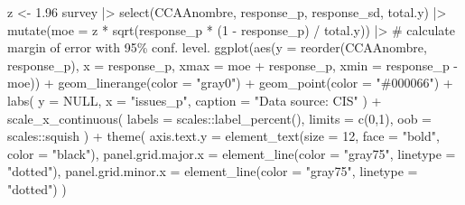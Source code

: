 \documentclass[
]{report}
\newenvironment{Shaded}{\begin{snugshade}}{\end{snugshade}}
\newcommand{\AttributeTok}[1]{\textcolor[rgb]{0.40,0.45,0.13}{#1}}
\newcommand{\CommentTok}[1]{\textcolor[rgb]{0.37,0.37,0.37}{#1}}
\newcommand{\ConstantTok}[1]{\textcolor[rgb]{0.56,0.35,0.01}{#1}}
\newcommand{\DecValTok}[1]{\textcolor[rgb]{0.68,0.00,0.00}{#1}}
\newcommand{\FloatTok}[1]{\textcolor[rgb]{0.68,0.00,0.00}{#1}}
\newcommand{\FunctionTok}[1]{\textcolor[rgb]{0.28,0.35,0.67}{#1}}
\newcommand{\NormalTok}[1]{\textcolor[rgb]{0.00,0.23,0.31}{#1}}
\newcommand{\OtherTok}[1]{\textcolor[rgb]{0.00,0.23,0.31}{#1}}
\newcommand{\SpecialCharTok}[1]{\textcolor[rgb]{0.37,0.37,0.37}{#1}}
\newcommand{\StringTok}[1]{\textcolor[rgb]{0.13,0.47,0.30}{#1}}
\begin{document}
\begin{Shaded}
\begin{Highlighting}[]
\NormalTok{z }\OtherTok{\textless{}{-}}  \FloatTok{1.96}
\NormalTok{survey }\SpecialCharTok{|\textgreater{}} 
  \FunctionTok{select}\NormalTok{(CCAAnombre, response\_p, response\_sd, total.y) }\SpecialCharTok{|\textgreater{}} 
  \FunctionTok{mutate}\NormalTok{(}\AttributeTok{moe =}\NormalTok{ z }\SpecialCharTok{*} \FunctionTok{sqrt}\NormalTok{(response\_p }\SpecialCharTok{*}\NormalTok{ (}\DecValTok{1} \SpecialCharTok{{-}}\NormalTok{ response\_p) }\SpecialCharTok{/}\NormalTok{ total.y)) }\SpecialCharTok{|\textgreater{}} \CommentTok{\# calculate margin of error with 95\% conf. level.}
    \FunctionTok{ggplot}\NormalTok{(}\FunctionTok{aes}\NormalTok{(}\AttributeTok{y =} \FunctionTok{reorder}\NormalTok{(CCAAnombre, response\_p), }\AttributeTok{x =}\NormalTok{ response\_p,}
             \AttributeTok{xmax =}\NormalTok{ moe }\SpecialCharTok{+}\NormalTok{ response\_p, }
             \AttributeTok{xmin =}\NormalTok{ response\_p }\SpecialCharTok{{-}}\NormalTok{ moe)) }\SpecialCharTok{+}
  \FunctionTok{geom\_linerange}\NormalTok{(}\AttributeTok{color =} \StringTok{"gray0"}\NormalTok{) }\SpecialCharTok{+}
  \FunctionTok{geom\_point}\NormalTok{(}\AttributeTok{color =} \StringTok{"\#000066"}\NormalTok{) }\SpecialCharTok{+}
  \FunctionTok{labs}\NormalTok{( }
    \AttributeTok{y =} \ConstantTok{NULL}\NormalTok{, }\AttributeTok{x =} \StringTok{"issues\_p"}\NormalTok{,}
    \AttributeTok{caption =} \StringTok{"Data source: CIS"}
\NormalTok{  ) }\SpecialCharTok{+}
  \FunctionTok{scale\_x\_continuous}\NormalTok{(}
    \AttributeTok{labels =}\NormalTok{ scales}\SpecialCharTok{::}\FunctionTok{label\_percent}\NormalTok{(),}
    \AttributeTok{limits =} \FunctionTok{c}\NormalTok{(}\DecValTok{0}\NormalTok{,}\DecValTok{1}\NormalTok{),}
    \AttributeTok{oob =}\NormalTok{ scales}\SpecialCharTok{::}\NormalTok{squish}
\NormalTok{  )  }\SpecialCharTok{+}
  \FunctionTok{theme}\NormalTok{(}
    \AttributeTok{axis.text.y =} \FunctionTok{element\_text}\NormalTok{(}\AttributeTok{size =} \DecValTok{12}\NormalTok{, }\AttributeTok{face =} \StringTok{"bold"}\NormalTok{, }\AttributeTok{color =} \StringTok{"black"}\NormalTok{),}
    \AttributeTok{panel.grid.major.x =} \FunctionTok{element\_line}\NormalTok{(}\AttributeTok{color =} \StringTok{"gray75"}\NormalTok{, }\AttributeTok{linetype =} \StringTok{"dotted"}\NormalTok{),}
    \AttributeTok{panel.grid.minor.x =} \FunctionTok{element\_line}\NormalTok{(}\AttributeTok{color =} \StringTok{"gray75"}\NormalTok{, }\AttributeTok{linetype =} \StringTok{"dotted"}\NormalTok{)}
\NormalTok{  )}
\end{Highlighting}
\end{Shaded}
\end{document}
